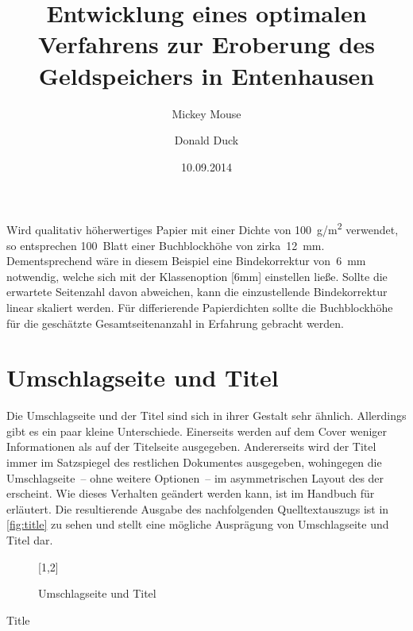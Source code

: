 \documentclass[%
  english,ngerman,%
  cdgeometry=no,DIV=12,automark,%
]{tudscrartcl}
\begin{document}
Wird qualitativ höherwertiges Papier mit einer Dichte von \SI{100}{g/m^2} 
verwendet, so entsprechen 100~Blatt einer Buchblockhöhe von zirka~\SI{12}{mm}. 
Dementsprechend wäre in diesem Beispiel eine Bindekorrektur von~\SI{6}{mm} 
notwendig, welche sich mit der Klassenoption [6mm] einstellen 
ließe. Sollte die erwartete Seitenzahl davon abweichen, kann die einzustellende 
Bindekorrektur linear skaliert werden. Für differierende Papierdichten sollte 
die Buchblockhöhe für die geschätzte Gesamtseitenanzahl in Erfahrung gebracht 
werden.






\section{Umschlagseite und Titel}
Die Umschlagseite und der Titel sind sich in ihrer Gestalt sehr ähnlich. 
Allerdings gibt es ein paar kleine Unterschiede. Einerseits werden auf dem 
Cover weniger Informationen als auf der Titelseite ausgegeben. Andererseits 
wird der Titel immer im Satzspiegel des restlichen Dokumentes ausgegeben, 
wohingegen die Umschlagseite~-- ohne weitere Optionen~-- im asymmetrischen 
Layout des \CDs der \TnUD erscheint. Wie dieses Verhalten geändert werden kann, 
ist im Handbuch für  erläutert. Die resultierende Ausgabe des 
nachfolgenden Quelltextauszugs ist in \autoref{fig:title} zu sehen und stellt 
eine mögliche Ausprägung von Umschlagseite und Titel dar.
%
\begin{figure}
[1,2]
\caption{Umschlagseite und Titel}
\label{fig:title}
\end{figure}

\begin{Trunk!}{Title}
\title{%
  Entwicklung eines optimalen Verfahrens zur Eroberung des
  Geldspeichers in Entenhausen
}
\author{%
  Mickey Mouse
\and%
  Donald Duck
}
\date{10.09.2014}

\makecover
\maketitle

\end{Trunk!}
\end{document}
